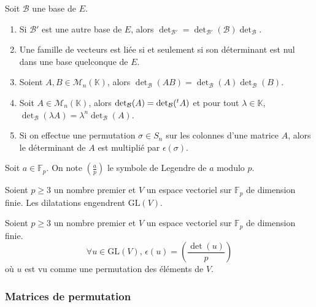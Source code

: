 	\begin{corollary}
		Soit $\mathcal{B}$ une base de $E$.
		\begin{enumerate}[label=(\roman*)]
			\item Si $\mathcal{B}'$ est une autre base de $E$, alors $\det_{\mathcal{B}'} = \det_{\mathcal{B}'}(\mathcal{B}) \det_{\mathcal{B}}$.
			\item Une famille de vecteurs est liée si et seulement si son déterminant est nul dans une base quelconque de $E$.
			\item Soient $A, B \in \mathcal{M}_n(\mathbb{K})$, alors $\det_{\mathcal{B}}(AB) = \det_{\mathcal{B}}(A) \det_{\mathcal{B}}(B)$.
			\item Soit $A \in \mathcal{M}_n(\mathbb{K})$, alors $\det_{\mathcal{B}}(A) = \det_{\mathcal{B}}(\mathstrut ^t A)$ et pour tout $\lambda \in \mathbb{K}$, $\det_{\mathcal{B}}(\lambda A) = \lambda^n \det_{\mathcal{B}}(A)$.
			\item Si on effectue une permutation $\sigma \in S_n$ sur les colonnes d'une matrice $A$, alors le déterminant de $A$ est multiplié par $\epsilon(\sigma)$.
		\end{enumerate}
	\end{corollary}


	\begin{notation}
		Soit $a \in \mathbb{F}_p$. On note $\left( \frac{a}{p} \right)$ le symbole de Legendre de $a$ modulo $p$.
	\end{notation}

	\begin{lemma}
		Soient $p \geq 3$ un nombre premier et $V$ un espace vectoriel sur $\mathbb{F}_p$ de dimension finie. Les dilatations engendrent $\mathrm{GL}(V)$.
	\end{lemma}


	\begin{theorem}
	  Soient $p \geq 3$ un nombre premier et $V$ un espace vectoriel sur $\mathbb{F}_p$ de dimension finie.
		\[ \forall u \in \mathrm{GL}(V), \, \epsilon(u) = \left( \frac{\det(u)}{p} \right) \]
		où $u$ est vu comme une permutation des éléments de $V$.
	\end{theorem}

	\subsubsection{Matrices de permutation}


